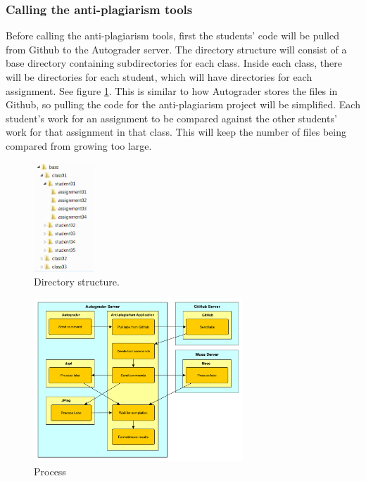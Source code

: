 \documentclass[12pt]{article}
\begin{document}
			\subsubsection{Calling the anti-plagiarism tools}
			Before calling the anti-plagiarism tools, first the students' code will be pulled from Github to the Autograder server. The directory structure will consist of a base directory containing subdirectories for each class. Inside each class, there will be directories for each student, which will have directories for each assignment. See figure \ref{fig:directories}. This is similar to how Autograder stores the files in Github, so pulling the code for the anti-plagiarism project will be simplified. Each student's work for an assignment to be compared against the other students' work for that assignment in that class. This will keep the number of files being compared from growing too large. 
			
			\begin{figure}[h!]
				\includegraphics[width=0.2\textwidth]{Directories.png}
				\caption{Directory structure.}
				\label{fig:directories}
			\end{figure}
			
			\begin{figure}[h!]
				\includegraphics[width=0.7\textwidth]{process.pdf}
				\caption{Process}
				\label{fig:process}
			\end{figure}
			
\end{document}

